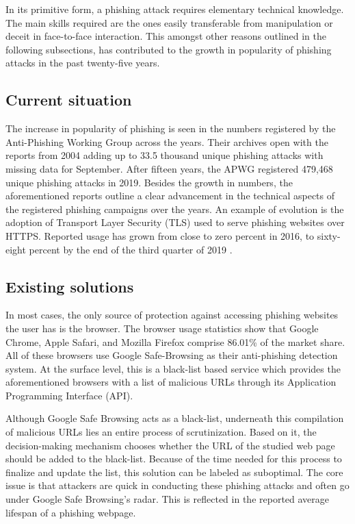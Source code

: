 In its primitive form, a phishing attack requires elementary technical knowledge. The main skills required are the ones easily transferable from manipulation or deceit in face-to-face interaction. This amongst other reasons outlined in the following subsections, has contributed to the growth in popularity of phishing attacks in the past twenty-five years.

\subsection{Current situation}
The increase in popularity of phishing is seen in the numbers registered by the Anti-Phishing Working Group \citep{APWG} across the years. Their archives open with the reports from 2004 adding up to 33.5 thousand unique phishing attacks with missing data for September. After fifteen years, the APWG registered 479,468 unique phishing attacks in 2019. Besides the growth in numbers, the aforementioned reports outline a clear advancement in the technical aspects of the registered phishing campaigns over the years. An example of evolution is the adoption of Transport Layer Security (TLS) used to serve phishing websites over HTTPS. Reported usage has grown from close to zero percent in 2016, to sixty-eight percent by the end of the third quarter of 2019 \citep{APWG_Q42019}.

\subsection{Existing solutions}
In most cases, the only source of protection against accessing phishing websites the user has is the browser. The browser usage statistics show that Google Chrome, Apple Safari, and Mozilla Firefox comprise 86.01\% of the market share. All of these browsers use Google Safe-Browsing as their anti-phishing detection system. At the surface level, this is a black-list based service which provides the aforementioned browsers with a list of malicious URLs through its Application Programming Interface (API).


Although Google Safe Browsing acts as a black-list, underneath this compilation of malicious URLs lies an entire process of scrutinization. Based on it, the decision-making mechanism chooses whether the URL of the studied web page should be added to the black-list. Because of the time needed for this process to finalize and update the list, this solution can be labeled as suboptimal. The core issue is that attackers are quick in conducting these phishing attacks and often go under Google Safe Browsing's radar. This is reflected in the reported average lifespan of a phishing webpage.


